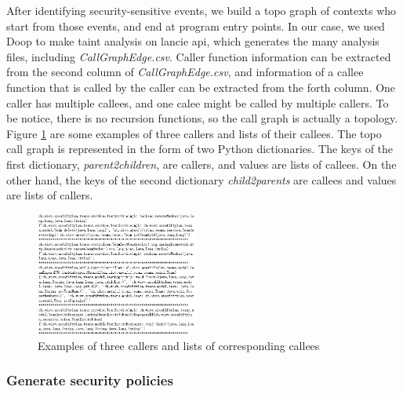 After identifying security-sensitive events, we build a topo graph of contexts who start from those events, and end at program entry points. In our case, we used Doop to make taint analysis on lancie api, which generates the many analysis files, including \textit{CallGraphEdge.csv}. Caller function information can be extracted from the second column of \textit{CallGraphEdge.csv}, and information of a callee function that is called by the caller can be extracted from the forth column. One caller has multiple callees, and one calee might be called by multiple callers. To be notice, there is no recursion functions, so the call graph is actually a topology. Figure \ref{caller2callee} are some examples of three callers and lists of their callees. The topo call graph is represented in the form of two Python dictionaries. The keys of the first dictionary, \textit{parent2children}, are callers, and values are lists of callees. On the other hand, the keys of the second dictionary \textit{child2parents} are callees and values are lists of callers. 

\begin{figure}[htp]
    \centering
    \includegraphics[width=0.48\textwidth]{img/caller2callee.png}
    \caption{Examples of three callers and lists of corresponding callees}
    \label{caller2callee}
\end{figure}


\subsubsection{Generate security policies}
